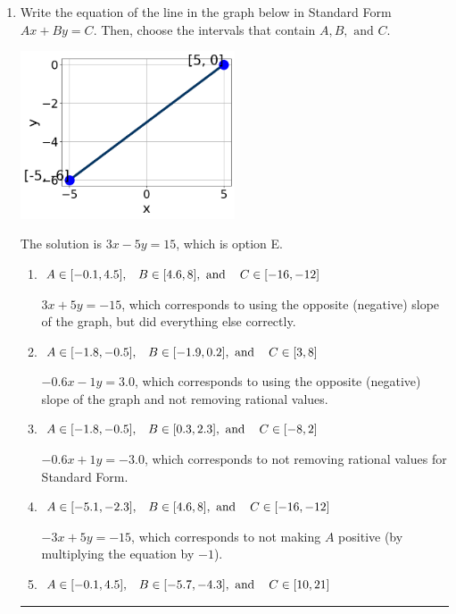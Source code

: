 \documentclass{extbook}[14pt]
\newcommand{\litem}[1]{\item #1

\rule{\textwidth}{0.4pt}}
\begin{document}
\begin{enumerate}\litem{
Write the equation of the line in the graph below in Standard Form $Ax+By=C$. Then, choose the intervals that contain $A, B, \text{ and } C$.

\begin{center}
    \includegraphics[width=0.5\textwidth]{../Figures/linearGraphToStandardA.png}
\end{center}


The solution is \( 3x - 5y = 15 \), which is option E.\begin{enumerate}[label=\Alph*.]
\item \( A \in [-0.1, 4.5], \hspace{3mm} B \in [4.6, 8], \text{ and } \hspace{3mm} C \in [-16, -12] \)

 $3x + 5y = -15$, which corresponds to using the opposite (negative) slope of the graph, but did everything else correctly.
\item \( A \in [-1.8, -0.5], \hspace{3mm} B \in [-1.9, 0.2], \text{ and } \hspace{3mm} C \in [3, 8] \)

 $-0.6x - 1y = 3.0$, which corresponds to using the opposite (negative) slope of the graph and not removing rational values.
\item \( A \in [-1.8, -0.5], \hspace{3mm} B \in [0.3, 2.3], \text{ and } \hspace{3mm} C \in [-8, 2] \)

 $-0.6x + 1y = -3.0$, which corresponds to not removing rational values for Standard Form.
\item \( A \in [-5.1, -2.3], \hspace{3mm} B \in [4.6, 8], \text{ and } \hspace{3mm} C \in [-16, -12] \)

 $-3x + 5y = -15$, which corresponds to not making $A$ positive (by multiplying the equation by $-1$).
\item \( A \in [-0.1, 4.5], \hspace{3mm} B \in [-5.7, -4.3], \text{ and } \hspace{3mm} C \in [10, 21] \)


\end{enumerate}}
\end{enumerate}
\end{document}
